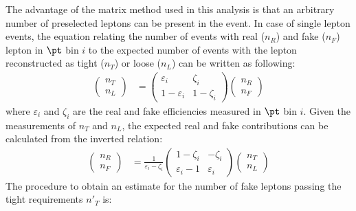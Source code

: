 The advantage of the matrix method used in this analysis is that an arbitrary number of preselected leptons can be present in the event. In case of single lepton events, the equation relating the number of events with real ($n_R$) and fake ($n_F$) lepton in $\pt$ bin $i$ to the expected number of events with the lepton reconstructed as tight ($n_T$) or loose ($n_L$) can be written as following:
\begin{align*}
  \begin{pmatrix} n_T \\ n_L \end{pmatrix} 
  &= 
  \begin{pmatrix}
  \varepsilon_i & \zeta_i \\ 1-\varepsilon_i & 1-\zeta_i
  \end{pmatrix} 
  \begin{pmatrix} n_R \\ n_F \end{pmatrix}
\end{align*}
where $\varepsilon_i$ and $\zeta_i$ are the real and fake efficiencies measured in $\pt$ bin $i$. Given the measurements of $n_T$ and $n_L$, the expected real and fake contributions can be calculated from the inverted relation:
\begin{align*}
  \begin{pmatrix} n_R \\ n_F \end{pmatrix} 
  &= 
  \frac{1}{\varepsilon_i-\zeta_i}
  \begin{pmatrix}
  1-\zeta_i & -\zeta_i \\ \varepsilon_i-1 & \varepsilon_i	
  \end{pmatrix} 
  \begin{pmatrix} n_T \\ n_L \end{pmatrix}
\end{align*}
The procedure to obtain an estimate for the number of fake leptons passing the tight requirements $n'_T$ is:
